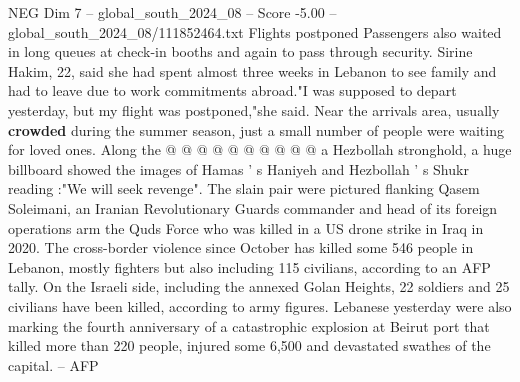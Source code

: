 \begin{textsample}{NEG Dim 7 – global\_south\_2024\_08 – Score -5.00 – global\_south\_2024\_08/111852464.txt}
Flights postponed Passengers also waited in long queues at check-in booths and again to pass through security.
Sirine Hakim, 22, said she had spent almost three weeks in Lebanon to see family and had to leave due to work commitments abroad."I was supposed to depart yesterday, but my flight was postponed,"she said.
Near the arrivals area, usually \textbf{crowded} during the summer season, just a small number of people were waiting for loved ones.
Along the @ @ @ @ @ @ @ @ @ @ a Hezbollah stronghold, a huge billboard showed the images of Hamas ' s Haniyeh and Hezbollah ' s Shukr reading :"We will seek revenge".
The slain pair were pictured flanking Qasem Soleimani, an Iranian Revolutionary Guards commander and head of its foreign operations arm the Quds Force who was killed in a US drone strike in Iraq in 2020.
The cross-border violence since October has killed some 546 people in Lebanon, mostly fighters but also including 115 civilians, according to an AFP tally.
On the Israeli side, including the annexed Golan Heights, 22 soldiers and 25 civilians have been killed, according to army figures.
Lebanese yesterday were also marking the fourth anniversary of a catastrophic explosion at Beirut port that killed more than 220 people, injured some 6,500 and devastated swathes of the capital. -- AFP

\end{textsample}
